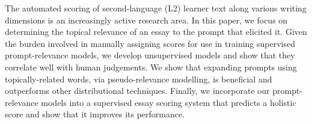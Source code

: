 The automated scoring of second-language (L2) learner text along various writing dimensions is an increasingly active research area. In this paper, we focus on determining the topical relevance of an essay to the prompt that elicited it. Given the burden involved in manually assigning scores for use in training supervised prompt-relevance models, we develop unsupervised models and show that they correlate well with human judgements. We show that expanding prompts using topically-related words, via pseudo-relevance modelling, is beneficial and outperforms other distributional techniques. Finally, we incorporate our prompt-relevance models into a supervised essay scoring system that predicts a holistic score and show that it improves its performance.
